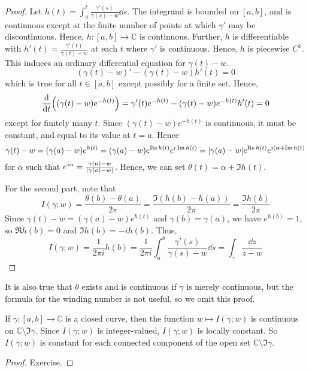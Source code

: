 \begin{proof}
	Let \( h(t) = \int_a^t \frac{\gamma'(s)}{\gamma(s) - w} \dd{s} \).
	The integrand is bounded on \( [a,b] \), and is continuous except at the finite number of points at which \( \gamma' \) may be discontinuous.
	Hence, \( h \colon [a,b] \to \mathbb C \) is continuous.
	Further, \( h \) is differentiable with \( h'(t) = \frac{\gamma'(t)}{\gamma(t) - w} \) at each \( t \) where \( \gamma' \) is continuous.
	Hence, \( h \) is piecewise \( C^1 \).
	This induces an ordinary differential equation for \( \gamma(t) - w \).
	\[ (\gamma(t) - w)' - (\gamma(t) - w)h'(t) = 0 \]
	which is true for all \( t \in [a,b] \) except possibly for a finite set.
	Hence,
	\[ \dv{t} \qty((\gamma(t) - w) e^{-h(t)}) = \gamma'(t) e^{-h(t)} - (\gamma(t) - w)e^{-h(t)} h'(t) = 0 \]
	except for finitely many \( t \).
	Since \( (\gamma(t) - w)e^{-h(t)} \) is continuous, it must be constant, and equal to its value at \( t = a \).
	Hence
	\[ \gamma(t) - w = (\gamma(a) - w)e^{h(t)} = (\gamma(a) - w)e^{\Re h(t)} e^{i\Im h(t)} = \abs{\gamma(a)-w} e^{\Re h(t)} e^{i(\alpha + \Im h(t)} \]
	for \( \alpha \) such that \( e^{i\alpha} = \frac{\gamma(a) - w}{\abs{\gamma(a) - w}} \).
	Hence, we can set \( \theta(t) = \alpha + \Im h(t) \).

	For the second part, note that
	\[ I(\gamma;w) = \frac{\theta(b) - \theta(a)}{2\pi} = \frac{\Im(h(b) - h(a))}{2\pi} = \frac{\Im h(b)}{2\pi} \]
	Since \( \gamma(t) - w = (\gamma(a) - w)e^{h(t)} \) and \( \gamma(b) = \gamma(a) \), we have \( e^{h(b)} = 1 \), so \( \Re h(b) = 0 \) and \( \Im h(b) = -i h(b) \).
	Thus,
	\[ I(\gamma;w) = \frac{1}{2\pi i} h(b) = \frac{1}{2\pi i} \int_a^b \frac{\gamma'(s)}{\gamma(s) - w} \dd{s} = \int_\gamma \frac{\dd{z}}{z-w} \]
\end{proof}
\begin{remark}
	It is also true that \( \theta \) exists and is continuous if \( \gamma \) is merely continuous, but the formula for the winding number is not useful, so we omit this proof.
\end{remark}
\begin{proposition}
	If \( \gamma \colon [a,b] \to \mathbb C \) is a closed curve, then the function \( w \mapsto I(\gamma;w) \) is continuous on \( \mathbb C \setminus \Im \gamma \).
	Since \( I(\gamma;w) \) is integer-valued, \( I(\gamma;w) \) is locally constant.
	So \( I(\gamma;w) \) is constant for each connected component of the open set \( \mathbb C \setminus \Im \gamma \).
\end{proposition}
\begin{proof}
	Exercise.
\end{proof}
